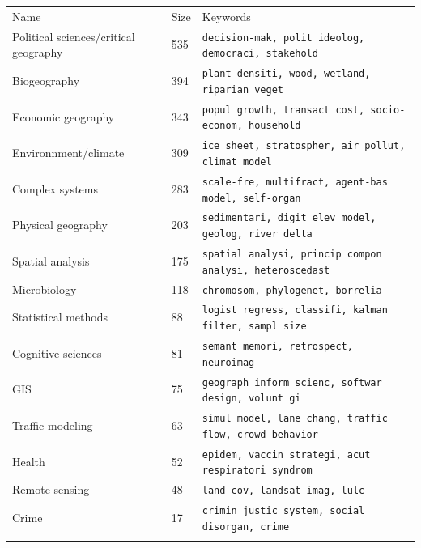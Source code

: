 \begin{table}
\hspace{-1cm}
\begin{tabular}{lll}
\hline\noalign{\smallskip}
Name & Size & Keywords  \\
\noalign{\smallskip}\hline\noalign{\smallskip}
Political sciences/critical geography & 535 & \texttt{decision-mak, polit ideolog, democraci, stakehold}\\%
Biogeography & 394 & \texttt{plant densiti, wood, wetland, riparian veget} \\
Economic geography & 343 &  \texttt{popul growth, transact cost, socio-econom, household}\\%
Environnment/climate & 309 & \texttt{ice sheet, stratospher, air pollut, climat model} \\
Complex systems & 283 & \texttt{scale-fre, multifract, agent-bas model, self-organ} \\
Physical geography & 203 & \texttt{sedimentari, digit elev model, geolog, river delta} \\
Spatial analysis & 175 & \texttt{spatial analysi, princip compon analysi, heteroscedast}\\%
Microbiology & 118 & \texttt{chromosom, phylogenet, borrelia} \\
Statistical methods & 88 & \texttt{logist regress, classifi, kalman filter, sampl size} \\
Cognitive sciences & 81 & \texttt{semant memori, retrospect, neuroimag} \\
GIS & 75 & \texttt{geograph inform scienc, softwar design, volunt gi}\\%
Traffic modeling & 63 & \texttt{simul model, lane chang, traffic flow, crowd behavior} \\
Health & 52 & \texttt{epidem, vaccin strategi, acut respiratori syndrom}\\%
Remote sensing & 48 & \texttt{land-cov, landsat imag, lulc} \\
Crime & 17 & \texttt{crimin justic system, social disorgan, crime} \\
\noalign{\smallskip}\hline
\end{tabular}
\end{table}


